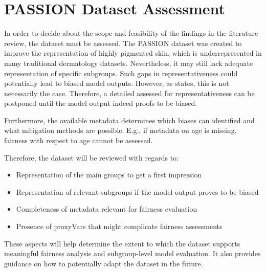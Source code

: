\documentclass[12pt, a4paper, oneside]{book}   	%
\begin{document}
		\section{PASSION Dataset Assessment}
			In order to decide about the scope and feasibility of the findings in the literature review, the dataset must be assessed.
			The PASSION dataset was created to improve the representation of highly pigmented skin, which is underrepresented in many traditional dermatology datasets. Nevertheless, it may still lack adequate representation of specific subgroups. Such gaps in representativeness could potentially lead to biased model outputs. However, as \textcite{Mehrabi_2021} states, this is not necessarily the case. Therefore, a detailed assessed for representativeness can be postponed until the model output indeed proofs to be biased.
			
			Furthermore, the available metadata determines which biases can identified and what mitigation methods are possible. E.g., if metadata on age is missing, fairness with respect to age cannot be assessed.
			
			Therefore, the dataset will be reviewed with regards to:
			\begin{itemize}
				\item Representation of the main groups to get a first impression
				\item Representation of relevant subgroups if the model output proves to be biased
				\item Completeness of metadata relevant for fairness evaluation
				\item Presence of \glspl{proxyVar} that might complicate fairness assessments
			\end{itemize}
			
			These aspects will help determine the extent to which the dataset supports meaningful fairness analysis and subgroup-level model evaluation. It also provides guidance on how to potentially adapt the dataset in the future.
		
\end{document}
